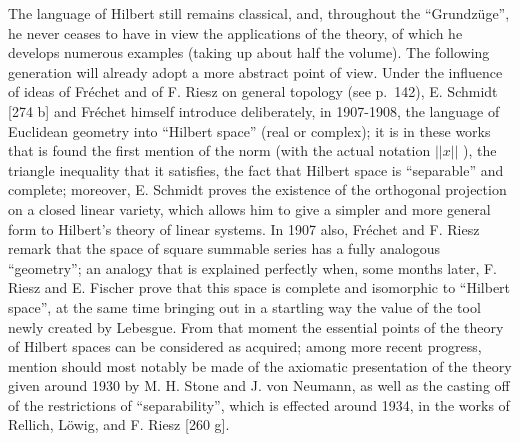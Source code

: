 The language of Hilbert still remains classical, and, throughout the ``Grundzüge'', he never ceases to have in view the applications of the theory, of which he develops numerous examples (taking up about half the volume). The following generation will already adopt a more abstract point of view. Under the influence of ideas of Fréchet and of F. Riesz on general topology (see p.~142), E. Schmidt {[}274 b{]} and Fréchet himself introduce deliberately, in 1907-1908, the language of Euclidean geometry into ``Hilbert space'' (real or complex); it is in these works that is found the first mention of the norm (with the actual notation \(||x||\) ), the triangle inequality that it satisfies, the fact that Hilbert space is ``separable'' and complete; moreover, E. Schmidt proves the existence of the orthogonal projection on a closed linear variety, which allows him to give a simpler and more general form to Hilbert's theory of linear systems. In 1907 also, Fréchet and F. Riesz remark that the space of square summable series has a fully analogous ``geometry''; an analogy that is explained perfectly when, some months later, F. Riesz and E. Fischer prove that this space is complete and isomorphic to ``Hilbert space'', at the same time bringing out in a startling way the value of the tool newly created by Lebesgue. From that moment the essential points of the theory of Hilbert spaces can be considered as acquired; among more recent progress, mention should most notably be made of the axiomatic presentation of the theory given around 1930 by M. H. Stone and J. von Neumann, as well as the casting off of the restrictions of ``separability'', which is effected around 1934, in the works of Rellich, Löwig, and F. Riesz {[}260 g{]}.

